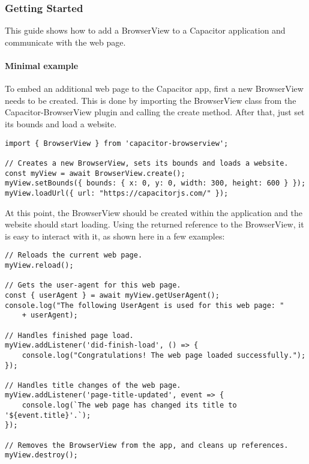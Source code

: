\subsubsection{Getting Started}
\label{sec:Capacitor-BrowserView:GettingStarted}

This guide shows how to add a BrowserView to a Capacitor application and communicate with the web page.

\paragraph{Minimal example}
\label{sec:Capacitor-BrowserView:MinimalExample}

To embed an additional web page to the Capacitor app, first a new BrowserView needs to be created.
This is done by importing the BrowserView class from the Capacitor-BrowserView plugin and calling the create method.
After that, just set its bounds and load a website.

\begin{verbatim}
import { BrowserView } from 'capacitor-browserview';

// Creates a new BrowserView, sets its bounds and loads a website.
const myView = await BrowserView.create();
myView.setBounds({ bounds: { x: 0, y: 0, width: 300, height: 600 } });
myView.loadUrl({ url: "https://capacitorjs.com/" });
\end{verbatim}

At this point, the BrowserView should be created within the application and the website should start loading.
Using the returned reference to the BrowserView, it is easy to interact with it, as shown here in a few examples:

\begin{verbatim}
// Reloads the current web page.
myView.reload();

// Gets the user-agent for this web page.
const { userAgent } = await myView.getUserAgent();
console.log("The following UserAgent is used for this web page: "
    + userAgent);

// Handles finished page load.
myView.addListener('did-finish-load', () => {
    console.log("Congratulations! The web page loaded successfully.");
});

// Handles title changes of the web page.
myView.addListener('page-title-updated', event => {
    console.log(`The web page has changed its title to '${event.title}'.`);
});

// Removes the BrowserView from the app, and cleans up references.
myView.destroy();
\end{verbatim}

